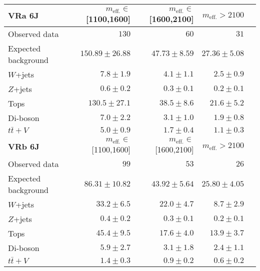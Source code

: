 \begin{table}
  \begin{center}
    \caption{ \label{tab::BGestimation::VRyields_6J}   }

    \begin{tabular*}{\textwidth}{@{\extracolsep{\fill}}lrrrr}
      \toprule
      \textbf{VRa 6J} & $m_{\mathrm{eff.}}\in$[1100,1600] & $m_{\mathrm{eff.}}\in$[1600,2100] & $m_{\mathrm{eff.}}>2100$ \\
      \midrule
      
Observed data          & $130$              & $60$              & $31$                    \\
\midrule
Expected background         & $150.89 \pm 26.88$          & $47.73 \pm 8.59$          & $27.36 \pm 5.08$              \\
\midrule
        $W$+jets         & $7.8 \pm 1.9$          & $4.1 \pm 1.1$          & $2.5 \pm 0.9$              \\
        $Z$+jets         & $0.6 \pm 0.2$          & $0.3 \pm 0.1$          & $0.2 \pm 0.1$              \\
        Tops         & $130.5 \pm 27.1$          & $38.5 \pm 8.6$          & $21.6 \pm 5.2$              \\
        Di-boson         & $7.0 \pm 2.2$          & $3.1 \pm 1.0$          & $1.9 \pm 0.8$              \\
        $t\bar{t}+V$         & $5.0 \pm 0.9$          & $1.7 \pm 0.4$          & $1.1 \pm 0.3$              \\
\toprule
\textbf{VRb 6J} &  $m_{\mathrm{eff.}}\in$[1100,1600] & $m_{\mathrm{eff.}}\in$[1600,2100] & $m_{\mathrm{eff.}}>2100$ \\
\midrule
Observed data          & $99$              & $53$              & $26$                    \\
\midrule
Expected background         & $86.31 \pm 10.82$          & $43.92 \pm 5.64$          & $25.80 \pm 4.05$              \\
\midrule
        $W$+jets         & $33.2 \pm 6.5$          & $22.0 \pm 4.7$          & $8.7 \pm 2.9$              \\
        $Z$+jets         & $0.4 \pm 0.2$          & $0.3 \pm 0.1$          & $0.2 \pm 0.1$              \\
        Tops         & $45.4 \pm 9.5$          & $17.6 \pm 4.0$          & $13.9 \pm 3.7$              \\
        Di-boson         & $5.9 \pm 2.7$          & $3.1 \pm 1.8$          & $2.4 \pm 1.1$              \\
        $t\bar{t}+V$         & $1.4 \pm 0.3$          & $0.9 \pm 0.2$          & $0.6 \pm 0.2$              \\
        \bottomrule
        \end{tabular*}

  \end{center}
\end{table}



